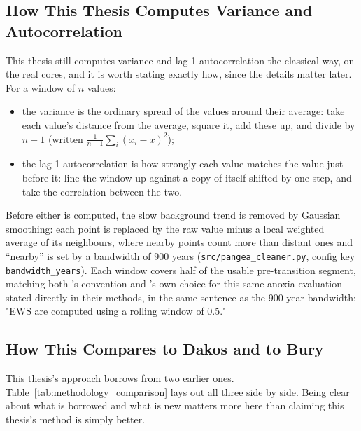 \subsection{How This Thesis Computes Variance and Autocorrelation}
\label{sec:actual_computation}
This thesis still computes variance and lag-1 autocorrelation the classical way, on the real cores, and it is worth stating exactly how, since the details matter later. For a window of $n$ values:

\begin{itemize}
    \item the variance is the ordinary spread of the values around their average: take each value's distance from the average, square it, add these up, and divide by $n-1$ (written $\frac{1}{n-1}\sum_i (x_i - \bar{x})^2$);
    \item the lag-1 autocorrelation is how strongly each value matches the value just before it: line the window up against a copy of itself shifted by one step, and take the correlation between the two.
\end{itemize}

Before either is computed, the slow background trend is removed by Gaussian smoothing: each point is replaced by the raw value minus a local weighted average of its neighbours, where nearby points count more than distant ones and ``nearby'' is set by a bandwidth of 900 years (\texttt{src/pangea\_cleaner.py}, config key \texttt{bandwidth\_years}). Each window covers half of the usable pre-transition segment, matching both \citet{dakos2012}'s convention and \citet{bury2021}'s own choice for this same anoxia evaluation -- stated directly in their methods, in the same sentence as the 900-year bandwidth: "EWS are computed using a rolling window of 0.5."

\subsection{How This Compares to Dakos and to Bury}
\label{sec:methodology_comparison}
This thesis's approach borrows from two earlier ones. Table~\ref{tab:methodology_comparison} lays out all three side by side. Being clear about what is borrowed and what is new matters more here than claiming this thesis's method is simply better.

